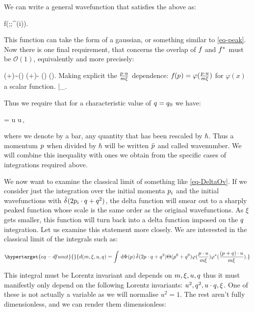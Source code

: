 \documentclass[
  10pt,
  a4paper,
  DIV=11,
  numbers=noendperiod,
  oneside]{scrreprt}
\let\[\relax \let\]\relax %
\DeclareRobustCommand{\[}{\begin{equation}}
\DeclareRobustCommand{\]}{\end{equation}}
\begin{document}
We can write a general wavefunction that satisfies the above as:

\[
f(\vert\cls{\vel[i]};\mass[i] ;\beta^{(i)}).
\]

This function can take the form of a gaussian, or something similar to
\ref{eq-peak}. Now there is one final requirement, that concerns the
overlap of \(\wf\) and \(\cwf\) must be \(\mathcal{O}(1)\), equivalently
and more precisely:

\[
\cwf(\emom+\tm)\sim \cwf(\emom) \implies \cwf(\emom+\tm)- \cwf(\emom) \implies \ct{\tm}\cwf(\emom).
\] Making explicit the \(\frac{\emom \cdot u }{m \xi}\) dependence:
\(\wf(\emom)=\varphi(\frac{\emom \cdot u }{m \xi})\) for \(\varphi(x)\)
a scalar function.
\[\implies {}\Bigr|_{}.\]

Thus we require that for a characteristic value of \(\tm=\co[0]{\tm}\)
we have:

\[
=\co[0]{\tw} \cdot u\iff \co[0]{\tw} \cdot u\,\wfwidth\ll \sqrt{ \xi},
\]

where we denote by a bar, any quantity that has been rescaled by
\(\hbar\). Thus a momentum \(\emom\) when divided by \(\hbar\) will be
written \(\bar{\emom}\) and called wavenumber. We will combine this
inequality with ones we obtain from the specific cases of integrations
required above.

We now want to examine the classical limit of something like
\ref{eq-DeltaOv}. If we consider just the integration over the initial
momenta \(\emom[i]\) and the initial wavefunctions with
\(\ndeltafn{2 \emom[i] \cdot \tm+\tm^2}\), the delta function will smear
out to a sharply peaked function whose scale is the same order as the
original wavefunctions. As \(\xi\) gets smaller, this function will turn
back into a delta function imposed on the \(\tm\) integration. Let us
examine this statement more closely. We are interested in the classical
limit of the integrals such as:

\begin{equation}\protect\hypertarget{eq-dfunct}{}{
d(m,\xi,u,\tm)=\int \ddP{\emom} \ndeltafn{2 \emom \cdot \tm+\tm^2} \thetafn{\emom^0+\tm^0}\varphi(\frac{\emom \cdot u }{m \xi})\varphi^*(\frac{(\emom+\tm) \cdot u }{m \xi}).
}\label{eq-dfunct}\end{equation}

This integral must be Lorentz invariant and depends on \(m,\xi, u,\tm\)
thus it must manifestly only depend on the following Lorentz invariants:
\(u^2,\tm^2,u \cdot \tm, \xi\). One of these is not actually a variable
as we will normalise \(u^2=1\). The rest aren't fully dimensionless, and
we can render them dimensionless:
\end{document}
